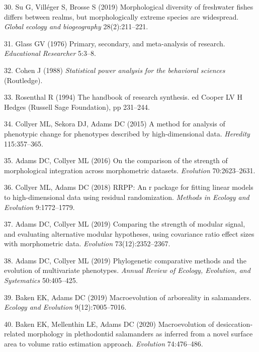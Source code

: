 \documentclass[9pt,twocolumn,twoside,lineno]{pnas-new}
\begin{document}
\leavevmode\hypertarget{ref-Su2019}{}%
30. Su G, Villéger S, Brosse S (2019) Morphological diversity of
freshwater fishes differs between realms, but morphologically extreme
species are widespread. \emph{Global ecology and biogeography}
28(2):211--221.

\leavevmode\hypertarget{ref-Glass1976}{}%
31. Glass GV (1976) Primary, secondary, and meta-analysis of research.
\emph{Educational Researcher} 5:3--8.

\leavevmode\hypertarget{ref-Cohen1988}{}%
32. Cohen J (1988) \emph{Statistical power analysis for the behavioral
sciences} (Routledge).

\leavevmode\hypertarget{ref-Rosenthal1994}{}%
33. Rosenthal R (1994) The handbook of research synthesis. ed Cooper LV
H Hedges (Russell Sage Foundation), pp 231--244.

\leavevmode\hypertarget{ref-Collyer_et_al2015a}{}%
34. Collyer ML, Sekora DJ, Adams DC (2015) A method for analysis of
phenotypic change for phenotypes described by high-dimensional data.
\emph{Heredity} 115:357--365.

\leavevmode\hypertarget{ref-AdamsCollyer2016}{}%
35. Adams DC, Collyer ML (2016) On the comparison of the strength of
morphological integration across morphometric datasets. \emph{Evolution}
70:2623--2631.

\leavevmode\hypertarget{ref-CollyerAdams2018}{}%
36. Collyer ML, Adams DC (2018) RRPP: An r package for fitting linear
models to high-dimensional data using residual randomization.
\emph{Methods in Ecology and Evolution} 9:1772--1779.

\leavevmode\hypertarget{ref-AdamsCollyer2019b}{}%
37. Adams DC, Collyer ML (2019) Comparing the strength of modular
signal, and evaluating alternative modular hypotheses, using covariance
ratio effect sizes with morphometric data. \emph{Evolution}
73(12):2352--2367.

\leavevmode\hypertarget{ref-AdamsCollyer2019}{}%
38. Adams DC, Collyer ML (2019) Phylogenetic comparative methods and the
evolution of multivariate phenotypes. \emph{Annual Review of Ecology,
Evolution, and Systematics} 50:405--425.

\leavevmode\hypertarget{ref-Baken2019}{}%
39. Baken EK, Adams DC (2019) Macroevolution of arboreality in
salamanders. \emph{Ecology and Evolution} 9(12):7005--7016.

\leavevmode\hypertarget{ref-Baken2020}{}%
40. Baken EK, Mellenthin LE, Adams DC (2020) Macroevolution of
desiccation‐related morphology in plethodontid salamanders as inferred
from a novel surface area to volume ratio estimation approach.
\emph{Evolution} 74:476--486.
\end{document}
